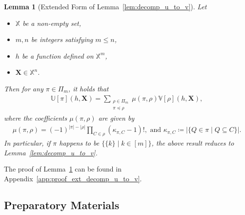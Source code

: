 \documentclass[12pt]{article}
\theoremstyle{plain}
\newtheorem{lemma}{Lemma}
\theoremstyle{definition}
\newcommand{\sPi}{\pi}
\newcommand{\ustat}{\mathbb{U}}
\newcommand{\vstat}{\mathbb{V}}
\newcommand{\samplespace}{\bbX}
\newcommand{\partition}{\Pi}
\newcommand{\partitionp}[1]{\partition_{#1}}
\newcommand{\pleq}{\preceq}
\def\bbX{\mathbb{X}}
\begin{document}
\begin{bibunit}[agsm]
\begin{lemma}[Extended Form of Lemma~\ref{lem:decomp_u_to_v}]
\label{lem:ext_decomp_u_to_v}
    Let
    \begin{itemize}
        \item $\samplespace$ be a non-empty set,
        \item $m,n$ be integers satisfying $m \leq n$,
        \item $h$ be a function defined on $\samplespace^m$,
        \item $\bm{X} \in \samplespace^n$. 
    \end{itemize}
    Then for any $\sPi \in \partitionp{m}$, it holds that
    \begin{align*}
        \ustat[\sPi](h,\bm{X}) 
        = \sum_{\substack{ \rho \in \partitionp{m} \\ \sPi \pleq \rho }}  
        \mu(\sPi, \rho)  \vstat[\rho](h, \bm{X}),
    \end{align*}
    where the coefficients $\mu(\sPi, \rho)$ are given by
    \begin{align*}
        \mu(\sPi, \rho) 
        = (-1)^{|\sPi|-|\rho|} 
        \prod_{C \in \rho} (\kappa_{\sPi, C} - 1)!, \text{ and } \kappa_{\sPi, C} \coloneqq |\{ Q \in \sPi \mid Q \subseteq C \}|.
    \end{align*}
    In particular, if $\sPi$ happens to be $\{\{k\} \mid k \in [m]\}$, the above result reduces to Lemma~\ref{lem:decomp_u_to_v}. 
\end{lemma}

The proof of Lemma~\ref{lem:ext_decomp_u_to_v} can be found in Appendix~\ref{app:proof_ext_decomp_u_to_v}.

\subsection{Preparatory Materials}\label{app:preparatory_materials}


\end{bibunit}
\end{document}
